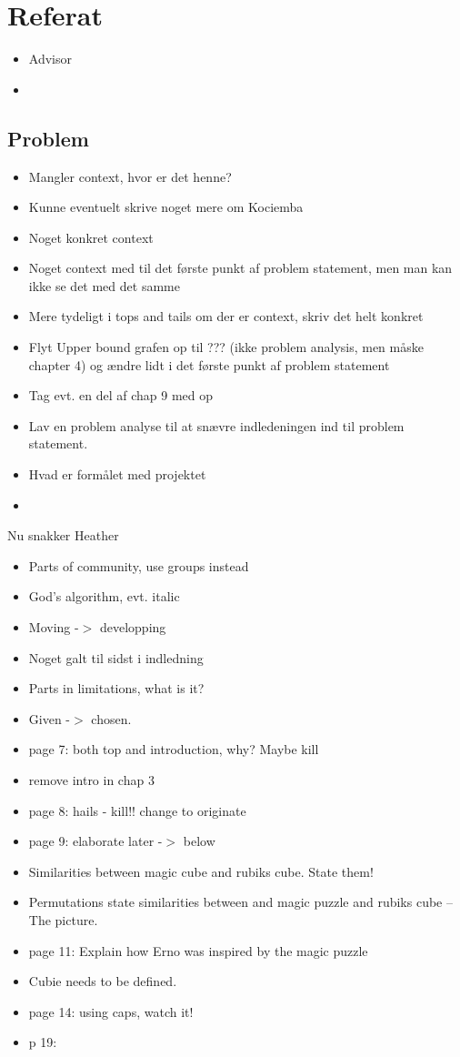 \section{Referat}
\label{ref}
\begin{itemize}
	\item Advisor
	\item 
\end{itemize}

\subsection{Problem}
\begin{itemize}
	\item Mangler context, hvor er det henne?
	\item Kunne eventuelt skrive noget mere om Kociemba
	\item Noget konkret context
	\item Noget context med til det f\o{}rste punkt af problem statement, men man kan ikke se det med det samme
	\item Mere tydeligt i tops and tails om der er context, skriv det helt konkret
	\item Flyt Upper bound grafen op til ??? (ikke problem analysis, men m\aa{}ske chapter 4) og \ae{}ndre lidt i det f\o{}rste punkt af problem statement
	\item Tag evt. en del af chap 9 med op
	\item Lav en problem analyse til at sn\ae{}vre indledeningen ind til problem statement.
	\item Hvad er form\aa{}let med projektet
	\item 
\end{itemize}


Nu snakker Heather
\begin{itemize}
	\item Parts of community, use groups instead
	\item God's algorithm, evt. italic
	\item Moving -$>$ developping
	\item Noget galt til sidst i indledning
	\item Parts in limitations, what is it?
	\item Given -$>$ chosen.
	\item page 7: both top and introduction, why? Maybe kill
	\item remove intro in chap 3
	\item page 8: hails - kill!! change to originate
	\item page 9: elaborate later -$>$ below
	\item Similarities between magic cube and rubiks cube. State them!
	\item Permutations state similarities between and magic puzzle and rubiks cube -- The picture.
	\item page 11: Explain how Erno was inspired by the magic puzzle
	\item Cubie needs to be defined.
	\item page 14: using caps, watch it!
	\item p 19: 
\end{itemize}

